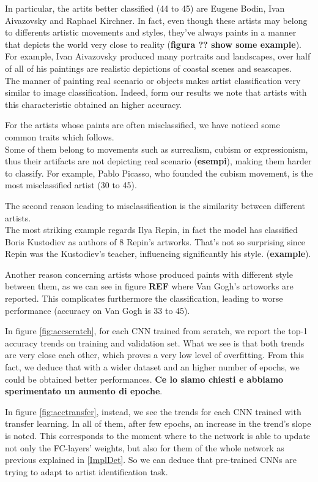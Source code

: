 \documentclass{article}
\begin{document}
In particular, the artits better classified (44 to 45) are Eugene Bodin, Ivan Aivazovsky and Raphael Kirchner. In fact, even though these artists may belong to differents artistic movements and styles, they've always paints in a manner that depicts the world very close to reality (\textbf{figura ?? show some example}).\\
For example, Ivan Aivazovsky produced many portraits and landscapes, over half of all of his paintings are realistic depictions of coastal scenes and seascapes. \\
The manner of painting real scenario or objects makes artist classification very similar to image classification. Indeed, form our results we note that artists with this characteristic obtained an higher accuracy.

For the artists whose paints are often misclassified, we have noticed some common traits which follows.\\
Some of them belong to movements such as surrealism, cubism or expressionism, thus their artifacts are not depicting real scenario (\textbf{esempi}), making them harder to classify.
For example, Pablo Picasso, who founded the cubism movement, is the most misclassified artist (30 to 45).
  
The second reason leading to misclassification is the similarity  between different artists.\\
The most striking example regards Ilya Repin, in fact the model has classified Boris Kustodiev as authors of 8 Repin's artworks. That's not so surprising since Repin was the Kustodiev's teacher, influencing significantly his style. (\textbf{example}).

Another reason concerning artists whose produced paints with different style between them, as we can see in figure \textbf{REF} where Van Gogh's artoworks are reported. This complicates furthermore the classification, leading to worse performance (accuracy on Van Gogh is 33 to 45).

In figure \ref{fig:accscratch}, for each CNN trained from scratch,  we report the top-1 accuracy trends on training and validation set. What we see is that both trends are very close each other, which proves a very low level of overfitting.
From this fact, we deduce that with a wider dataset and an higher number of epochs, we could be obtained better performances. \textbf{Ce lo siamo chiesti e abbiamo sperimentato un aumento di epoche}.

In figure \ref{fig:acctransfer}, instead, we see the trends for each CNN trained with transfer learning. In all of them, after few epochs, an increase in the trend's slope is noted. This corresponds to the moment where to the network is able to update not only the FC-layers' weights, but also for them of the whole network as previous explained in \ref{ImplDet}. So we can deduce that pre-trained CNNs are trying to adapt to artist identification task.
\end{document}
